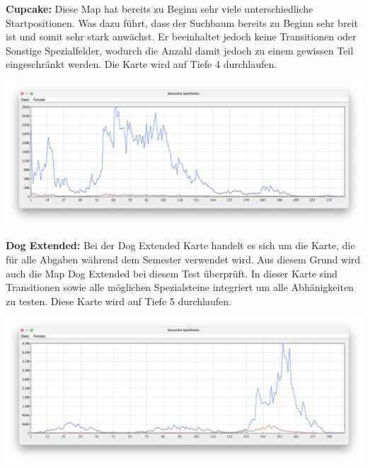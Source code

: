 \textbf{Cupcake:}
Diese Map hat bereits zu Beginn sehr viele unterschiedliche Startpositionen.
Was dazu f\"uhrt, dass der Suchbaum bereits zu Beginn sehr breit ist und somit sehr stark anw\"achst.
Er beeinhaltet jedoch keine Transitionen oder Sonstige Spezialfelder, wodurch die Anzahl damit jedoch zu einem gewissen Teil eingeschr\"ankt werden.
Die Karte wird auf Tiefe 4 durchlaufen.

\begin{minipage}{\linewidth}
    \centering
    \includegraphics[width=0.9\linewidth]{statistic/CUP-01/ST-01-D4-LD}
    \label{fig:statistic-graph-cupcake}
\end{minipage}
\vspace{1em}

\textbf{Dog Extended:}
Bei der Dog Extended Karte handelt es sich um die Karte, die f\"ur alle Abgaben w\"ahrend dem Semester verwendet wird.
Aus diesem Grund wird auch die Map Dog Extended bei diesem Test \"uberpr\"uft.
In dieser Karte sind Transitionen sowie alle m\"oglichen Spezialsteine integriert um alle Abh\"anigkeiten zu testen.
Diese Karte wird auf Tiefe 5 durchlaufen.

\begin{minipage}{\linewidth}
    \centering
    \includegraphics[width=0.9\linewidth]{statistic/DOG-02/ST-01-D4-LD}
    \label{fig:statistic-graph-dog}
\end{minipage}
\vspace{1em}

